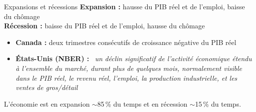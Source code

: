 \documentclass[aspectratio=169]{beamer}
\begin{document}
\begin{frame}[t]{Expansions et récessions}\examtag
   \small
   \textbf{Expansion :} hausse du PIB réel et de l'emploi, baisse du chômage\\ \vspace{0.3cm}
   \textbf{Récession :} baisse du PIB réel et de l'emploi, hausse du chômage
   \vspace{0.2cm}
   \begin{itemize}
      \setlength\itemsep{0.2cm}
      \item \textbf{Canada :} deux trimestres consécutifs de croissance négative du PIB réel
      \item \textbf{États-Unis (NBER) :} \guillemotleft~\textit{un déclin significatif de l’activité économique étendu à l’ensemble du marché, durant plus de quelques mois, normalement visible dans le PIB réel, le revenu réel, l’emploi, la production industrielle, et les ventes de gros/détail}~\guillemotright
   \end{itemize}

   \vspace{0.1cm}
   \begin{keyinsight}
      L'économie est en expansion $\sim$85\,\% du temps et en récession $\sim$15\,\% du temps.
   \end{keyinsight}
\end{frame}
\end{document}
